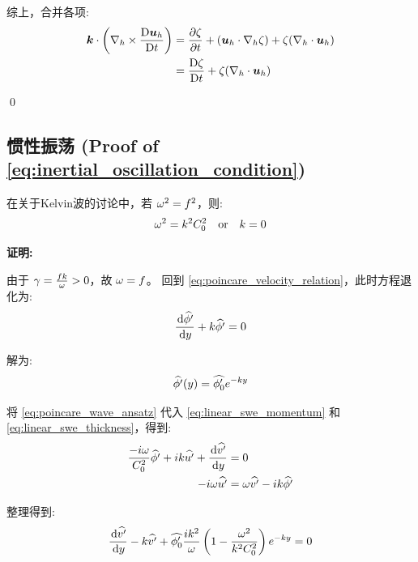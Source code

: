 综上，合并各项:
\begin{align*}
    \kvec \cdot \left(\nabla_h \times \matderiv{\vel_h}\right)
    &= \pde{\relvort}{\timevar} + (\vel_h \cdot \nabla_h \relvort) + \relvort(\nabla_h \cdot \vel_h) \\
    &= \matderiv{\relvort} + \relvort(\nabla_h \cdot \vel_h)
\end{align*}

\qed

\subsection*{惯性振荡 (Proof of \eqref{eq:inertial_oscillation_condition})}

在关于Kelvin波的讨论中，若 $\omega^2 = f^2$，则:
\begin{equation}
    \omega^2 = k^2 C_0^2 \quad \text{or} \quad k = 0
    \label{eq:inertial_oscillation_condition_proof}
\end{equation}

\vspace{1em}
\textbf{证明:}

由于 $\gamma = \frac{f k}{\omega} > 0$，故 $\omega = f$。
回到 \eqref{eq:poincare_velocity_relation}，此时方程退化为:
\begin{equation}
    \ode{\complexamp{\gravpotential^\prime}}{y} + k \complexamp{\gravpotential^\prime} = 0
    \label{eq:oscillation_ode}
\end{equation}

解为:
\begin{equation}
    \widehat{\phi^\prime}(y) = \widehat{\phi_0^\prime} e^{-k y}
    \label{eq:wave_solution_oscillation}
\end{equation}

将 \eqref{eq:poincare_wave_ansatz} 代入 \eqref{eq:linear_swe_momentum} 和 \eqref{eq:linear_swe_thickness}，得到:
\begin{align*}
    \frac{-i \frequency}{C_0^2} \complexamp{\gravpotential^\prime} + i k \complexamp{u^\prime} + \ode{\complexamp{v^\prime}}{y} &= 0 \\
    -i \frequency \complexamp{u^\prime} &= \frequency \complexamp{v^\prime} - i k \complexamp{\gravpotential^\prime}
\end{align*}

整理得到:
\begin{equation*}
    \ode{\complexamp{v^\prime}}{y} - k \complexamp{v^\prime} + \complexamp{\gravpotential_0^\prime} \frac{i k^2}{\frequency} \left(1 - \frac{\frequency^2}{k^2 C_0^2}\right) e^{-k y} = 0
\end{equation*}

